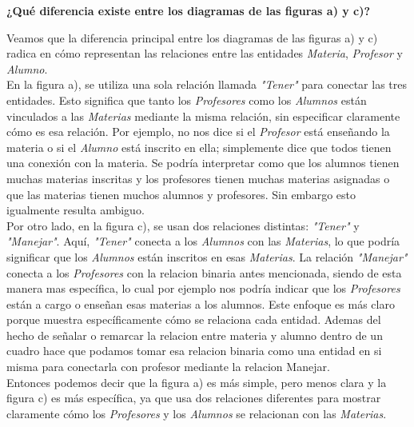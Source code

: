 \begin{center} \textbf{¿Qué diferencia existe entre los diagramas de las figuras a) y c)?} \end{center}

\vspace{.3cm}

Veamos que la diferencia principal entre los diagramas de las figuras a) y c) radica en cómo representan las relaciones entre las entidades \textit{Materia}, \textit{Profesor} y \textit{Alumno}. \\

En la figura a), se utiliza una sola relación llamada \textit{"Tener"} para conectar las tres entidades. Esto significa que tanto los \textit{Profesores} como los \textit{Alumnos} están vinculados a las \textit{Materias} mediante la misma relación, sin especificar claramente cómo es esa relación. Por ejemplo, no nos dice si el \textit{Profesor} está enseñando la materia o si el \textit{Alumno} está inscrito en ella; simplemente dice que todos tienen una conexión con la materia. Se podría interpretar como que los alumnos tienen muchas materias inscritas y los profesores tienen muchas materias asignadas o que las materias tienen muchos alumnos y profesores. Sin embargo esto igualmente resulta ambiguo. \\

Por otro lado, en la figura c), se usan dos relaciones distintas: \textit{"Tener"} y \textit{"Manejar"}. Aquí, \textit{"Tener"} conecta a los \textit{Alumnos} con las \textit{Materias}, lo que podría significar que los \textit{Alumnos} están inscritos en esas \textit{Materias}. La relación \textit{"Manejar"} conecta a los \textit{Profesores} con la relacion binaria antes mencionada, siendo de esta manera mas específica, lo cual por ejemplo nos podría indicar que los \textit{Profesores} están a cargo o enseñan esas materias a los alumnos. Este enfoque es más claro porque muestra específicamente cómo se relaciona cada entidad. Ademas del hecho de señalar o remarcar la relacion entre materia y alumno dentro de un cuadro hace que podamos tomar esa relacion binaria como una entidad en si misma para conectarla con profesor mediante la relacion Manejar. \\

Entonces podemos decir que la figura a) es más simple, pero menos clara y la figura c) es más específica, ya que usa dos relaciones diferentes para mostrar claramente cómo los \textit{Profesores} y los \textit{Alumnos} se relacionan con las \textit{Materias}. \\